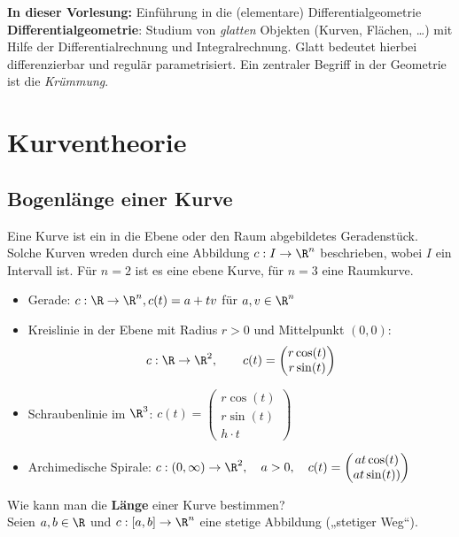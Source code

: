 \documentclass{mycourse}
\begin{document}
\textbf{In dieser Vorlesung:} Einführung in die (elementare) Differentialgeometrie \\
\textbf{Differentialgeometrie}: Studium von \emph{glatten} Objekten (Kurven, Flächen, \dots) mit Hilfe der Differentialrechnung und Integralrechnung.
Glatt bedeutet hierbei differenzierbar und regulär parametrisiert.
Ein zentraler Begriff in der Geometrie ist die \emph{Krümmung}.

\newpage


\chapter{Kurventheorie}

\section{Bogenlänge einer Kurve}

Eine Kurve ist ein in die Ebene oder den Raum abgebildetes Geradenstück. Solche Kurven wreden durch eine Abbildung $c: I \to \R^n$ beschrieben, wobei  $I$ ein Intervall ist. Für $n = 2$ ist es eine ebene Kurve, für $n = 3$ eine Raumkurve.

\begin{ex}
\label{1.1}
\begin{itemize}
	\item Gerade: $ c: \R \to \R^n , c(t) = a + t v $ für $ a, v \in \R^n$
	\item Kreislinie in der Ebene mit Radius $ r > 0$ und Mittelpunkt $(0,0)$: \[ c: \R \to \R^2, \qquad c(t) = \begin{pmatrix} r \cos(t) \\  r \sin(t) \end{pmatrix} \]
	\item Schraubenlinie im $\R^3$: $c(t) = \begin{pmatrix} r \cos(t) \\ r \sin(t) \\  h \cdot t \end{pmatrix}$
	\item Archimedische Spirale: $ c: (0,\infty) \to \R^2 , \quad a > 0, \quad c(t) = \begin{pmatrix} a  t  \cos(t) \\ a  t  \sin(t)) \end{pmatrix}$
\end{itemize}
\end{ex}

Wie kann man die \textbf{Länge} einer Kurve bestimmen? \\
Seien $a,b \in \R$ und $c: [a,b] \to \R^n$ eine stetige Abbildung („stetiger Weg“). \\
\end{document}
